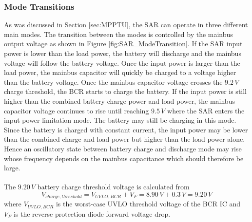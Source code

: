 \subsubsection{Mode Transitions}
%
As was discussed in Section \ref{sec:MPPTU}, the \ac{SAR} can operate in three different main modes. The transition between the modes is controlled by the mainbus output voltage as shown in Figure \ref{fig:SAR_ModeTransition}. If the \ac{SAR} input power is lower than the load power, the battery will discharge and the mainbus voltage will follow the battery voltage. Once the input power is larger than the load power, the mainbus capacitor will quickly be charged to a voltage higher than the battery voltage. Once the mainbus capacitor voltage crosses the $9.2\,V$ charge threshold, the \ac{BCR} starts to charge the battery. If the input power is still higher than the combined battery charge power and load power, the mainbus capacitor voltage continues to rise until reaching $9.5\,V$ where the \ac{SAR} enters the input power limitation mode. The battery may still be charging in this mode. Since the battery is charged with constant current, the input power may be lower than the combined charge and load power but higher than the load power alone. Hence an oscillatory state between battery charge and discharge mode may rise whose frequency depends on the mainbus capacitance which should therefore be large. 
\\
\\
The $9.20\,V$ battery charge threshold voltage is calculated from
%
\begin{equation}
V_{charge,threshold}=V_{UVLO,BCR}+V_F=8.90\,V+0.3\,V= 9.20\,V
\end{equation}
%
where $V_{UVLO,BCR}$ is the worst-case \ac{UVLO} threshold voltage of the \ac{BCR} \ac{IC} and $V_F$ is the reverse protection diode forward voltage drop.
%
%
